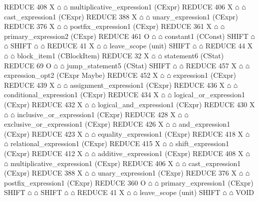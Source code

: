 \begin{isabellebody}
\begin{isamarkuptext}
\begin{isar}
                              REDUCE 408 X $\house$ $\house$ multiplicative_expression1  (CExpr) 
                               REDUCE 406 X $\house$ $\house$ cast_expression1  (CExpr) 
                                REDUCE 388 X $\house$ $\house$ unary_expression1  (CExpr) 
                                 REDUCE 376 X $\house$ $\house$ postfix_expression1  (CExpr) 
                                  REDUCE 361 X $\house$ $\house$ primary_expression2  (CExpr) 
                                   REDUCE 461 O $\house$ $\house$ constant1  (CConst) 
                                    SHIFT $\house$ $\house$ 
                 SHIFT $\house$ $\house$ 
             REDUCE 41 X $\house$ $\house$ leave_scope  (unit) 
             SHIFT $\house$ $\house$ 
       REDUCE 44 X $\house$ $\house$ block_item1  (CBlockItem) 
        REDUCE 32 X $\house$ $\house$ statement6  (CStat) 
         REDUCE 69 O $\house$ $\house$ jump_statement5  (CStat) 
          SHIFT $\house$ $\house$ 
          REDUCE 457 X $\house$ $\house$ expression_opt2  (CExpr Maybe) 
           REDUCE 452 X $\house$ $\house$ expression1  (CExpr) 
            REDUCE 439 X $\house$ $\house$ assignment_expression1  (CExpr) 
             REDUCE 436 X $\house$ $\house$ conditional_expression1  (CExpr) 
              REDUCE 434 X $\house$ $\house$ logical_or_expression1  (CExpr) 
               REDUCE 432 X $\house$ $\house$ logical_and_expression1  (CExpr) 
                REDUCE 430 X $\house$ $\house$ inclusive_or_expression1  (CExpr) 
                 REDUCE 428 X $\house$ $\house$ exclusive_or_expression1  (CExpr) 
                  REDUCE 426 X $\house$ $\house$ and_expression1  (CExpr) 
                   REDUCE 423 X $\house$ $\house$ equality_expression1  (CExpr) 
                    REDUCE 418 X $\house$ $\house$ relational_expression1  (CExpr) 
                     REDUCE 415 X $\house$ $\house$ shift_expression1  (CExpr) 
                      REDUCE 412 X $\house$ $\house$ additive_expression1  (CExpr) 
                       REDUCE 408 X $\house$ $\house$ multiplicative_expression1  (CExpr) 
                        REDUCE 406 X $\house$ $\house$ cast_expression1  (CExpr) 
                         REDUCE 388 X $\house$ $\house$ unary_expression1  (CExpr) 
                          REDUCE 376 X $\house$ $\house$ postfix_expression1  (CExpr) 
                           REDUCE 360 O $\house$ $\house$ primary_expression1  (CExpr) 
                            SHIFT $\house$ $\house$ 
          SHIFT $\house$ $\house$ 
      REDUCE 41 X $\house$ $\house$ leave_scope  (unit) 
      SHIFT $\house$ $\house$ 
VOID  
\end{isar}%
\end{isamarkuptext}\isamarkuptrue%
%
\isadelimtheory
%
\endisadelimtheory
%
\isatagtheory
%
\endisatagtheory
{\isafoldtheory}%
%
\isadelimtheory
%
\endisadelimtheory
%
\end{isabellebody}%
